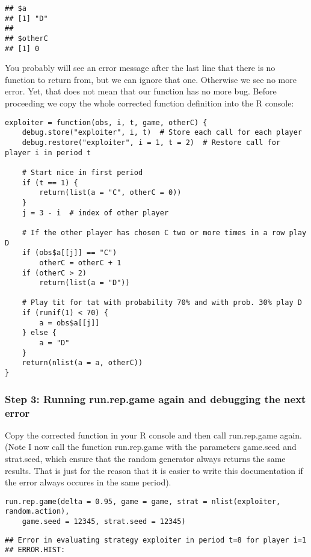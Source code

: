 \documentclass[]{article}
\begin{document}
\begin{verbatim}
## $a
## [1] "D"
## 
## $otherC
## [1] 0
\end{verbatim}

You probably will see an error message after the last line that there is
no function to return from, but we can ignore that one. Otherwise we see
no more error. Yet, that does not mean that our function has no more
bug. Before proceeding we copy the whole corrected function definition
into the R console:

\begin{verbatim}
exploiter = function(obs, i, t, game, otherC) {
    debug.store("exploiter", i, t)  # Store each call for each player
    debug.restore("exploiter", i = 1, t = 2)  # Restore call for player i in period t

    # Start nice in first period
    if (t == 1) {
        return(list(a = "C", otherC = 0))
    }
    j = 3 - i  # index of other player

    # If the other player has chosen C two or more times in a row play D
    if (obs$a[[j]] == "C") 
        otherC = otherC + 1
    if (otherC > 2) 
        return(list(a = "D"))

    # Play tit for tat with probability 70% and with prob. 30% play D
    if (runif(1) < 70) {
        a = obs$a[[j]]
    } else {
        a = "D"
    }
    return(nlist(a = a, otherC))
}
\end{verbatim}

\subsubsection{Step 3: Running run.rep.game again and debugging the next
error}

Copy the corrected function in your R console and then call run.rep.game
again. (Note I now call the function run.rep.game with the parameters
game.seed and strat.seed, which ensure that the random generator always
returns the same results. That is just for the reason that it is easier
to write this documentation if the error always occures in the same
period).

\begin{verbatim}
run.rep.game(delta = 0.95, game = game, strat = nlist(exploiter, random.action), 
    game.seed = 12345, strat.seed = 12345)
\end{verbatim}

\begin{verbatim}
## Error in evaluating strategy exploiter in period t=8 for player i=1
## ERROR.HIST:
\end{verbatim}
\end{document}
